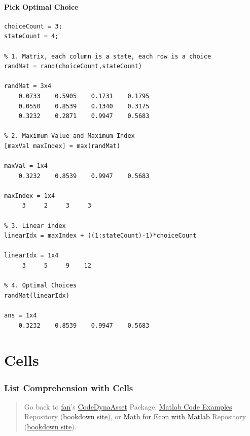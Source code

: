 \documentclass[
]{book}
\begin{document}
\hypertarget{pick-optimal-choice}{%
\paragraph{\texorpdfstring{\textbf{Pick Optimal Choice}}{Pick Optimal Choice}}\label{pick-optimal-choice}}

\begin{verbatim}
choiceCount = 3;
stateCount = 4;

% 1. Matrix, each column is a state, each row is a choice
randMat = rand(choiceCount,stateCount)

randMat = 3x4    
    0.0733    0.5905    0.1731    0.1795
    0.0550    0.8539    0.1340    0.3175
    0.3232    0.2871    0.9947    0.5683

% 2. Maximum Value and Maximum Index
[maxVal maxIndex] = max(randMat)

maxVal = 1x4    
    0.3232    0.8539    0.9947    0.5683

maxIndex = 1x4    
     3     2     3     3

% 3. Linear index
linearIdx = maxIndex + ((1:stateCount)-1)*choiceCount

linearIdx = 1x4    
     3     5     9    12

% 4. Optimal Choices
randMat(linearIdx)

ans = 1x4    
    0.3232    0.8539    0.9947    0.5683
\end{verbatim}

\hypertarget{cells}{%
\section{Cells}\label{cells}}

\hypertarget{list-comprehension-with-cells}{%
\subsubsection{List Comprehension with Cells}\label{list-comprehension-with-cells}}

\begin{quote}
Go back to \href{http://fanwangecon.github.io/}{fan}'s \href{https://fanwangecon.github.io/CodeDynaAsset/}{CodeDynaAsset} Package, \href{https://fanwangecon.github.io/M4Econ/}{Matlab Code Examples} Repository (\href{https://fanwangecon.github.io/M4Econ/bookdown}{bookdown site}), or \href{https://fanwangecon.github.io/Math4Econ/}{Math for Econ with Matlab} Repository (\href{https://fanwangecon.github.io/Math4Econ/bookdown}{bookdown site}).
\end{quote}
\end{document}

